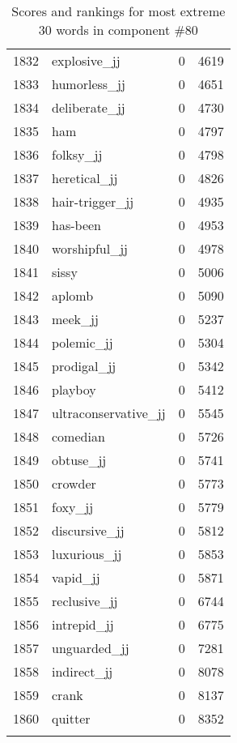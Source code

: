 \begin{longtable}[!htbp]{| rlr@{.}l |}
    1832 & explosive\_jj & 0 & 4619 \\
    1833 & humorless\_jj & 0 & 4651 \\
    1834 & deliberate\_jj & 0 & 4730 \\
    1835 & ham & 0 & 4797 \\
    1836 & folksy\_jj & 0 & 4798 \\
    1837 & heretical\_jj & 0 & 4826 \\
    1838 & hair-trigger\_jj & 0 & 4935 \\
    1839 & has-been & 0 & 4953 \\
    1840 & worshipful\_jj & 0 & 4978 \\
    1841 & sissy & 0 & 5006 \\
    1842 & aplomb & 0 & 5090 \\
    1843 & meek\_jj & 0 & 5237 \\
    1844 & polemic\_jj & 0 & 5304 \\
    1845 & prodigal\_jj & 0 & 5342 \\
    1846 & playboy & 0 & 5412 \\
    1847 & ultraconservative\_jj & 0 & 5545 \\
    1848 & comedian & 0 & 5726 \\
    1849 & obtuse\_jj & 0 & 5741 \\
    1850 & crowder & 0 & 5773 \\
    1851 & foxy\_jj & 0 & 5779 \\
    1852 & discursive\_jj & 0 & 5812 \\
    1853 & luxurious\_jj & 0 & 5853 \\
    1854 & vapid\_jj & 0 & 5871 \\
    1855 & reclusive\_jj & 0 & 6744 \\
    1856 & intrepid\_jj & 0 & 6775 \\
    1857 & unguarded\_jj & 0 & 7281 \\
    1858 & indirect\_jj & 0 & 8078 \\
    1859 & crank & 0 & 8137 \\
    1860 & quitter & 0 & 8352 \\
    \hline
    \caption{Scores and rankings for most extreme 30 words in component \#80} \\
\end{longtable}
